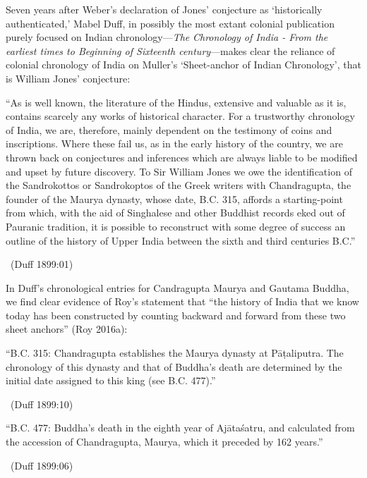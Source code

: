 Seven years after Weber’s declaration of Jones’ conjecture as ‘historically authenticated,’ Mabel Duff, in possibly the most extant colonial publication purely focused on Indian chronology—\textit{The} \textit{Chronology of India - From the earliest times to Beginning of Sixteenth century}—makes clear the reliance of colonial chronology of India on Muller’s ‘Sheet-anchor of Indian Chronology’, that is William Jones’ conjecture:

\begin{myquote}
“As is well known, the literature of the Hindus, extensive and valuable as it is, contains scarcely any works of historical character. For a trustworthy chronology of India, we are, therefore, mainly dependent on the testimony of coins and inscriptions. Where these fail us, as in the early history of the country, we are thrown back on conjectures and inferences which are always liable to be modified and upset by future discovery. To Sir William Jones we owe the identification of the Sandrokottos or Sandrokoptos of the Greek writers with Chandragupta, the founder of the Maurya dynasty, whose date, B.C. 315, affords a starting-point from which, with the aid of Singhalese and other Buddhist records eked out of Pauranic tradition, it is possible to reconstruct with some degree of success an outline of the history of Upper India between the sixth and third centuries B.C.” 

~\hfill (Duff 1899:01)
\end{myquote}

In Duff’s chronological entries for Candragupta Maurya and Gautama Buddha, we find clear evidence of Roy’s statement that “the history of India that we know today has been constructed by counting backward and forward from these two sheet anchors” (Roy 2016a):

\begin{myquote}
“B.C. 315: Chandragupta establishes the Maurya dynasty at Pāṭaliputra. The chronology of this dynasty and that of Buddha's death are determined by the initial date assigned to this king (see B.C. 477).” 

~\hfill (Duff 1899:10)
\end{myquote}

\begin{myquote}
“B.C. 477: Buddha's death in the eighth year of Ajātaśatru, and calculated from the accession of Chandragupta, Maurya, which it preceded by 162 years.” 

~\hfill (Duff 1899:06)
\end{myquote}

